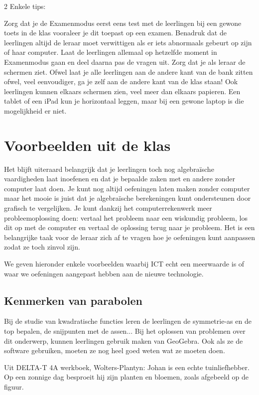 \begin{multicols}{2}
Enkele tips:

Zorg dat je de Examenmodus eerst eens test met de leerlingen bij een gewone toets in de klas vooraleer je dit toepast op een examen. Benadruk dat de leerlingen altijd de leraar moet verwittigen als er iets abnormaals gebeurt op zijn of haar computer. Laat de leerlingen allemaal op hetzelfde moment in Examenmodus gaan en deel daarna pas de vragen uit. Zorg dat je als leraar de schermen ziet. Ofwel laat je alle leerlingen aan de andere kant van de bank zitten ofwel, veel eenvoudiger, ga je zelf aan de andere kant van de klas staan! Ook leerlingen kunnen elkaars schermen zien, veel meer dan elkaars papieren. Een tablet of een iPad kun je horizontaal leggen, maar bij een gewone laptop is die mogelijkheid er niet.



	\section{Voorbeelden uit de klas}
	Het blijft uiteraard belangrijk dat je leerlingen toch nog algebraïsche vaardigheden laat inoefenen en dat je bepaalde zaken met en andere zonder computer laat doen. Je kunt nog altijd oefeningen laten maken zonder computer maar het mooie is juist dat je algebraïsche berekeningen kunt ondersteunen door grafisch te vergelijken. Je kunt dankzij het computerrekenwerk meer probleemoplossing doen: vertaal het probleem naar een wiskundig probleem, los dit op met de computer en vertaal de oplossing terug naar je probleem. 
	Het is een belangrijke taak voor de leraar zich af te vragen hoe je oefeningen kunt aanpassen zodat ze toch zinvol zijn.
	
		We geven hieronder enkele voorbeelden waarbij ICT echt een meerwaarde is of waar we oefeningen aangepast hebben aan de nieuwe technologie. 
	
	\subsection{Kenmerken van parabolen }
Bij de studie van kwadratische functies leren de leerlingen de symmetrie-as en de top bepalen, de snijpunten met de assen... Bij het oplossen van problemen over dit onderwerp, kunnen leerlingen gebruik maken van GeoGebra. Ook als ze de software gebruiken, moeten ze nog heel goed weten wat ze moeten doen.


Uit DELTA-T 4A werkboek, Wolters-Plantyn: Johan is een echte tuinliefhebber. Op een zonnige dag besproeit hij zijn planten en bloemen, zoals afgebeeld op de figuur.


\end{multicols}
